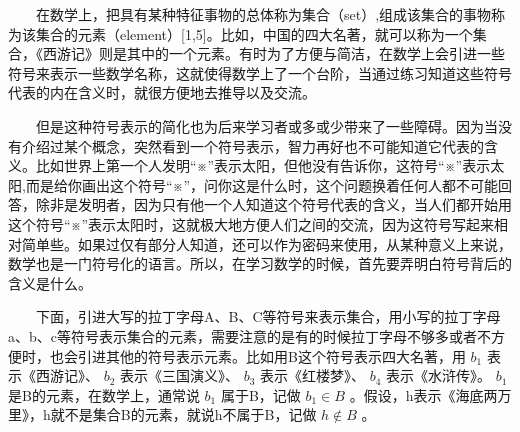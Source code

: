 \documentclass[a4paper,11pt,english]{sphinxmanual}
\begin{document}
\sphinxAtStartPar
  在数学上，把具有某种特征事物的总体称为集合（set）,组成该集合的事物称为该集合的元素（element）{[}1,5{]}。比如，中国的四大名著，就可以称为一个集合，《西游记》则是其中的一个元素。有时为了方便与简洁，在数学上会引进一些符号来表示一些数学名称，这就使得数学上了一个台阶，当通过练习知道这些符号代表的内在含义时，就很方便地去推导以及交流。

\sphinxAtStartPar
  但是这种符号表示的简化也为后来学习者或多或少带来了一些障碍。因为当没有介绍过某个概念，突然看到一个符号表示，智力再好也不可能知道它代表的含义。比如世界上第一个人发明“※”表示太阳，但他没有告诉你，这符号“※”表示太阳,而是给你画出这个符号“※”，问你这是什么时，这个问题换着任何人都不可能回答，除非是发明者，因为只有他一个人知道这个符号代表的含义，当人们都开始用这个符号“※”表示太阳时，这就极大地方便人们之间的交流，因为这符号写起来相对简单些。如果过仅有部分人知道，还可以作为密码来使用，从某种意义上来说，数学也是一门符号化的语言。所以，在学习数学的时候，首先要弄明白符号背后的含义是什么。

\sphinxAtStartPar
  下面，引进大写的拉丁字母A、B、C等符号来表示集合，用小写的拉丁字母a、b、c等符号表示集合的元素，需要注意的是有的时候拉丁字母不够多或者不方便时，也会引进其他的符号表示元素。比如用B这个符号表示四大名著，用 \(b_1\) 表示《西游记》、 \(b_2\) 表示《三国演义》、 \(b_3\) 表示《红楼梦》、 \(b_4\) 表示《水浒传》。 \(b_1\) 是B的元素，在数学上，通常说 \(b_1\) 属于B，记做 \({b_1} \in B\) 。假设，h表示《海底两万里》，h就不是集合B的元素，就说h不属于B，记做 \({h} \notin B\) 。
\end{document}
